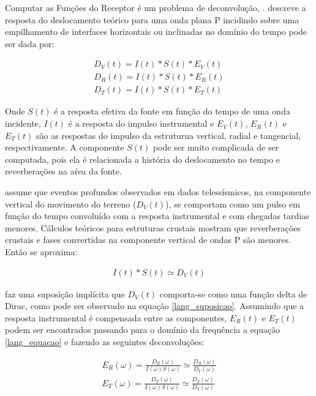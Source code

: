 Computar as Funções do Receptor é um problema de deconvolução,  \cite{ligorria_iterative_1999}. \cite{langston_structure_1979} descreve a resposta do deslocamento teórico para uma onda plana P incidindo sobre uma empilhamento de interfaces horizontais ou inclinadas no domínio do tempo pode ser dada por:

\begin{eqnarray} \label{lang_equacao}
D_{V}(t) = I(t) * S(t) * E_{V}(t)
\nonumber
\\
D_{R}(t) = I(t) * S(t) * E_{R}(t)
\\
\nonumber
D_{T}(t) = I(t) * S(t) * E_{T}(t)
\end{eqnarray}

Onde $S(t)$ é a resposta efetiva da fonte em função do tempo de uma onda incidente, $I(t)$ é a resposta do impulso instrumental e $E_{V}(t)$, $E_{R}(t)$ e $E_{T}(t)$ são as respostas do impulso da estruturua vertical, radial e tangencial, respectivamente. A componente $S(t)$ pode ser muito complicada de ser computada, pois ela é relacionada a história do deslocamento no tempo e reverberações na aŕea da fonte.

\cite{langston_structure_1979} assume que eventos profundos observados em dados telessísmicos, na componente vertical do movimento do terreno ($D_{V}(t)$), se comportam como um pulso em função do tempo convoluído com a resposta instrumental e com chegadas tardias menores. Cálculos teóricos para estruturas crustais mostram que reverberações crustais e fases convertidas na componente vertical de ondas P são menores. Então se aproxima:

\begin{eqnarray} \label{lang_suposicao}
I(t) * S(t) \simeq D_{V}(t)
\end{eqnarray}

\cite{langston_structure_1979} faz uma suposição implícita que $D_{V}(t)$ comporta-se como uma função delta de Dirac, como pode ser observado na equação \ref{lang_suposicao}. Assumindo que a resposta instrumental é compensada entre as componentes, $E_{R}(t)$ e $E_{T}(t)$ podem ser encontrados passando para o domínio da frequência a equação \ref{lang_equacao} e fazendo as seguintes deconvoluções:

\begin{eqnarray} \label{lang_resposta}
E_{R}(\omega) =  \frac{D_{R}(\omega)}{I(\omega)S(\omega)} \simeq \frac{D_{R}(\omega)}{D_{V}(\omega)}
\\ \nonumber
E_{T}(\omega) =  \frac{D_{T}(\omega)}{I(\omega)S(\omega)} \simeq \frac{D_{T}(\omega)}{D_{V}(\omega)}
\end{eqnarray}

